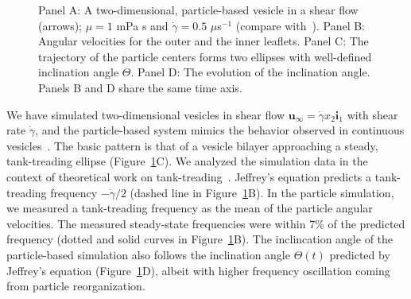 \begin{figure}
\vspace{-5pt}
  \vspace{-10pt}
  \caption{\label{fig:tank_treading} \footnotesize
    Panel A: A two-dimensional, particle-based vesicle in a shear flow
    (arrows); $\mu = 1$ mPa s and $\dot{\gamma} = 0.5$ $\mu$s$^{-1}$
    (compare with~\cite{Brandner2019}).  Panel B: Angular velocities for
    the outer and the inner leaflets.  Panel C: The trajectory of the
    particle centers forms two ellipses with well-defined inclination
    angle $\Theta$. Panel D: The evolution of the inclination angle.
    Panels B and D share the same time axis.}
\end{figure}
We have simulated two-dimensional vesicles in shear flow
$\mathbf{u}_{\infty} = \dot{\gamma} x_2 \mathbf{i}_1$ with shear rate
$\dot{\gamma}$,
and the particle-based system mimics the behavior observed in continuous
vesicles~\cite{torres-sanchez_millan_arroyo_2019,
mahapatra_saintillan_rangamani_2020, Steigmann99, C6SM02452A}. The basic
pattern is that of a vesicle bilayer approaching a steady, tank-treading
ellipse (Figure~\ref{fig:tank_treading}C). We analyzed the simulation
data in the context of theoretical work on
tank-treading~\cite{Finken2008, PhysRevLett.106.158103}.
Jeffrey's equation predicts a tank-treading frequency $-\dot{\gamma}/2$ (dashed line in
Figure~\ref{fig:tank_treading}B). In the particle simulation, we measured
a tank-treading frequency as the mean of the particle angular
velocities. The measured steady-state frequencies were within 7\% of the predicted 
frequency (dotted and solid curves in Figure~\ref{fig:tank_treading}B).
The inclincation angle of the particle-based simulation also
follows the inclination angle $\Theta(t)$ predicted by Jeffrey's
equation (Figure~\ref{fig:tank_treading}D), albeit with higher frequency oscillation
coming from particle reorganization.

